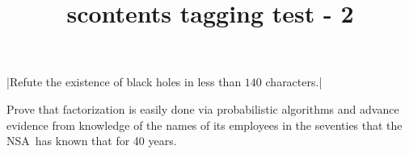 \documentclass{article}
\title{scontents tagging test - 2}
\begin{document}
\Scontents*|Refute the existence of black holes in less than $140$ characters.|
\begin{scontents}[write-env=\jobname.txt]
\def\NSA{NSA}%
Prove that factorization is easily done via probabilistic algorithms and
advance evidence from knowledge of the names of its employees in the
seventies that the \NSA\ has known that for 40 years.\par
\end{scontents}
\begin{itemize}
\end{itemize}
\section{}
\end{document}
